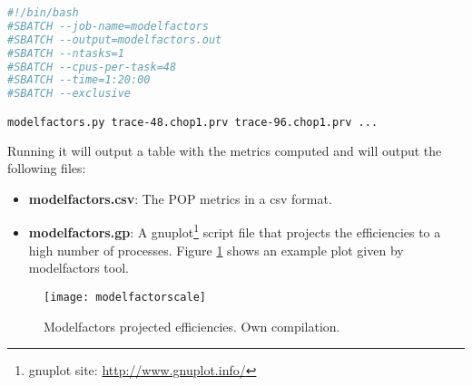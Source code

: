 \begin{lstlisting}[language=sh, caption={Running modelfactors with SLURM.}, label={modelfactorslst}]
#!/bin/bash
#SBATCH --job-name=modelfactors
#SBATCH --output=modelfactors.out
#SBATCH --ntasks=1
#SBATCH --cpus-per-task=48
#SBATCH --time=1:20:00
#SBATCH --exclusive

modelfactors.py trace-48.chop1.prv trace-96.chop1.prv ...
\end{lstlisting}

\clearpage
Running it will output a table with the metrics computed and will output the following files:
\begin{itemize}
  \item \textbf{modelfactors.csv}: The POP metrics in a csv format.
  \item \textbf{modelfactors.gp}: A gnuplot\footnote{gnuplot site: \url{http://www.gnuplot.info/}} script file that projects the efficiencies to a high number of processes. Figure \ref{mfscaling} shows an example plot given by modelfactors tool.
\end{itemize}

\begin{figure}[htbp!]
  \centering
  \texttt{[image: modelfactorscale]}
  \caption[Modelfactors projected efficiences.]{Modelfactors projected efficiencies. Own compilation.}
  \label{mfscaling}
\end{figure}

